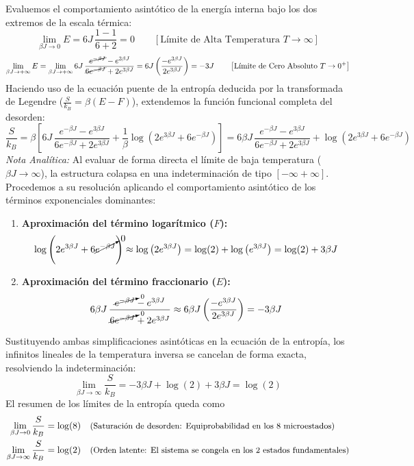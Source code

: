 \begin{ejemplo}
\noindent 
Evaluemos el comportamiento asintótico de la energía interna bajo los dos extremos de la escala térmica:
\[
\lim_{\beta J \to 0} E = 6J \, \frac{1 - 1}{6 + 2} = 0 \qquad \left[\text{Límite de Alta Temperatura } T \to \infty\right]
\]
\[
\lim_{\beta J \to +\infty} E = \lim_{\beta J \to +\infty} 6J \, \frac{\cancel{e^{-\beta J}} - e^{3\beta J}}{\cancel{6e^{-\beta J}} + 2e^{3\beta J}} = 6J \left( \frac{-e^{3\beta J}}{2e^{3\beta J}} \right) = -3J \qquad \left[\text{Límite de Cero Absoluto } T \to 0^+\right]
\]
Haciendo uso de la ecuación puente de la entropía deducida por la transformada de Legendre ($\frac{S}{k_B} = \beta(E - F)$), extendemos la función funcional completa del desorden:
\[
\frac{S}{k_B} = \beta \left[ 6J \, \frac{e^{-\beta J} - e^{3\beta J}}{6e^{-\beta J} + 2e^{3\beta J}} + \frac{1}{\beta} \log\left(2e^{3\beta J} + 6e^{-\beta J}\right) \right] = 6\beta J \, \frac{e^{-\beta J} - e^{3\beta J}}{6e^{-\beta J} + 2e^{3\beta J}} + \log\left(2e^{3\beta J} + 6e^{-\beta J}\right)
\]
\textit{Nota Analítica:} Al evaluar de forma directa el límite de baja temperatura ($\beta J \to \infty$), la estructura colapsa en una indeterminación de tipo $[-\infty + \infty]$. Procedemos a su resolución aplicando el comportamiento asintótico de los términos exponenciales dominantes:

\begin{enumerate}
    \item \textbf{Aproximación del término logarítmico ($F$):}
    \[
    \log\left(2e^{3\beta J} + 6\cancelto{0}{e^{-\beta J}}\right) \approx \log\left(2e^{3\beta J}\right) = \log(2) + \log\left(e^{3\beta J}\right) = \log(2) + 3\beta J
    \]
    \item \textbf{Aproximación del término fraccionario ($E$):}
    \[
    6\beta J \, \frac{\cancelto{0}{e^{-\beta J}} - e^{3\beta J}}{\cancelto{0}{6e^{-\beta J}} + 2e^{3\beta J}} \approx 6\beta J \left( \frac{-e^{3\beta J}}{2e^{3\beta J}} \right) = -3\beta J
    \]
\end{enumerate}
Sustituyendo ambas simplificaciones asintóticas en la ecuación de la entropía, los infinitos lineales de la temperatura inversa se cancelan de forma exacta, resolviendo la indeterminación:
\[
\lim_{\beta J \to \infty} \frac{S}{k_B} = -3\beta J + \log(2) + 3\beta J = \boxed{\log(2)}
\]
El resumen de los límites de la entropía queda como
\begin{align*}
    \lim_{\beta J \to 0} \frac{S}{k_B} &= \log(8) \quad \text{\small (Saturación de desorden: Equiprobabilidad en los 8 microestados)} \\
    \lim_{\beta J \to \infty} \frac{S}{k_B} &= \log(2) \quad \text{\small (Orden latente: El sistema se congela en los 2 estados fundamentales)}
\end{align*}
\end{ejemplo}


